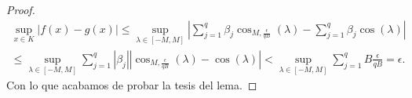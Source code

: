 \begin{proof}
    \begin{equation}
        \begin{split}
        \sup_{x \in K} | f(x) - g(x)| 
        \leq
        \sup_{\lambda \in [-M, M]} 
        | \sum_{j=1}^q \beta_j \cos_{M, \frac{\epsilon}{qB}}(\lambda )
         - 
         \sum_{j=1}^q \beta_j \cos(\lambda )|  \\
        \leq
        \sup_{\lambda \in [-M, M]} 
        \sum_{j=1}^q 
            |\beta_j|
            |
                \cos_{M, \frac{\epsilon}{qB}}(\lambda)
                -
                \cos(\lambda)
            |   
            <
            \sup_{\lambda \in [-M, M]} 
            \sum_{j=1}^q   
                B
                \frac{\epsilon}{qB}
            = \epsilon.
        \end{split}
    \end{equation}
     Con lo que acabamos de probar la tesis del lema. 
\end{proof}


